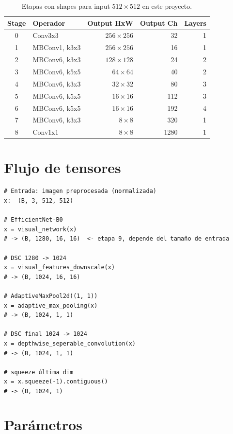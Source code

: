 \begin{table}[H]
\centering
\caption{Etapas con shapes para input $512 \times 512$ en este proyecto.}
\label{tab:effnet-shapes}
\begin{tabular}{clrrr}
\toprule
\textbf{Stage} & \textbf{Operador} & \textbf{Output HxW} & \textbf{Output Ch} & \textbf{Layers} \\
\midrule
0  & Conv3x3       & $256 \times 256$  & 32   & 1 \\
1  & MBConv1, k3x3 & $256 \times 256$  & 16   & 1 \\
2  & MBConv6, k3x3 & $128 \times 128$  & 24   & 2 \\
3  & MBConv6, k5x5 & $64 \times 64$    & 40   & 2 \\
4  & MBConv6, k3x3 & $32 \times 32$    & 80   & 3 \\
5  & MBConv6, k5x5 & $16 \times 16$    & 112  & 3 \\
6  & MBConv6, k5x5 & $16 \times 16$    & 192  & 4 \\
7  & MBConv6, k3x3 & $8 \times 8$      & 320  & 1 \\
8  & Conv1x1       & $8 \times 8$      & 1280 & 1 \\
\bottomrule
\end{tabular}
\end{table}

\section{Flujo de tensores}

\begin{verbatim}
# Entrada: imagen preprocesada (normalizada)
x:  (B, 3, 512, 512)

# EfficientNet-B0
x = visual_network(x)
# -> (B, 1280, 16, 16)  <- etapa 9, depende del tamaño de entrada

# DSC 1280 -> 1024
x = visual_features_downscale(x)
# -> (B, 1024, 16, 16)

# AdaptiveMaxPool2d((1, 1))
x = adaptive_max_pooling(x)
# -> (B, 1024, 1, 1)

# DSC final 1024 -> 1024
x = depthwise_seperable_convolution(x)
# -> (B, 1024, 1, 1)

# squeeze última dim
x = x.squeeze(-1).contiguous()
# -> (B, 1024, 1)
\end{verbatim}

\section{Parámetros}

